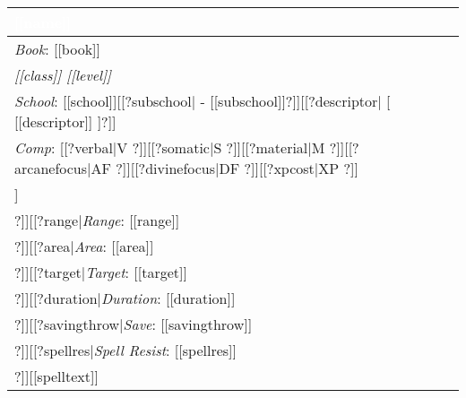 \noindent
\begin{supertabular}{|p{9cm}|}
\hline
{}\vspace{1mm}\sf\Large\textbf{\textcolor{white}{[[name]]}} \\
\hline
\textit{Book}: [[book]] \\
\hline
\textit{[[class]] [[level]]}\\
\hline
\textit{School}: [[school]][[?subschool| - [[subschool]]?]][[?descriptor| [ [[descriptor]] ]?]]\\
\hline
\textit{Comp}: [[?verbal|V ?]][[?somatic|S ?]][[?material|M ?]][[?arcanefocus|AF ?]][[?divinefocus|DF ?]][[?xpcost|XP ?]]\\
\hline
[[?castingtime|\textit{Casting Time}: [[castingtime]] \\
\hline
?]][[?range|\textit{Range}: [[range]] \\
\hline
?]][[?area|\textit{Area}: [[area]] \\
\hline
?]][[?target|\textit{Target}: [[target]] \\
\hline
?]][[?duration|\textit{Duration}: [[duration]] \\
\hline
?]][[?savingthrow|\textit{Save}: [[savingthrow]] \\
\hline
?]][[?spellres|\textit{Spell Resist}: [[spellres]] \\
\hline
?]][[spelltext]]\\
\hline
\end{supertabular}

